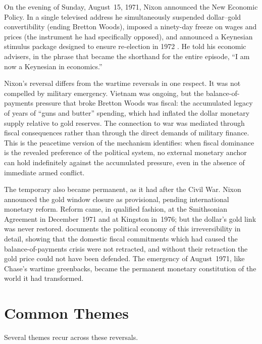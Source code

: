 \documentclass[12pt]{article}
\begin{document}
On the evening of Sunday, August~15, 1971, Nixon announced the New
Economic Policy.  In a single televised address he simultaneously
suspended dollar--gold convertibility (ending Bretton Woods), imposed a
ninety-day freeze on wages and prices (the instrument he had specifically
opposed), and announced a Keynesian stimulus package designed to ensure
re-election in 1972 \citep{Matusow1998}.  He told his economic advisers,
in the phrase that became the shorthand for the entire episode, ``I am
now a Keynesian in economics.''

Nixon's reversal differs from the wartime reversals in one respect.
It was not compelled by military emergency.  Vietnam was ongoing, but the balance-of-payments
pressure that broke Bretton Woods was fiscal: the
accumulated legacy of years of ``guns and butter'' spending, which had
inflated the dollar monetary supply relative to gold reserves.  The
connection to war was mediated through fiscal consequences rather than
through the direct demands of military finance.  This is the peacetime
version of the mechanism \citet{Sargent2011} identifies: when fiscal
dominance is the revealed preference of the political system, no external
monetary anchor can hold indefinitely against the accumulated pressure,
even in the absence of immediate armed conflict.

The temporary also became permanent, as it had after the Civil War.
Nixon announced the gold window closure as provisional, pending
international monetary reform.  Reform came, in qualified fashion, at
the Smithsonian Agreement in December~1971 and at Kingston in~1976; but
the dollar's gold link was never restored.  \citet{Gowa1983} documents
the political economy of this irreversibility in detail, showing that
the domestic fiscal commitments which had caused the balance-of-payments
crisis were not retracted, and without their retraction the gold price
could not have been defended.  The emergency of August~1971, like Chase's
wartime greenbacks, became the permanent monetary constitution of the
world it had transformed.


\section{Common Themes}

Several themes recur across these reversals.
\end{document}
